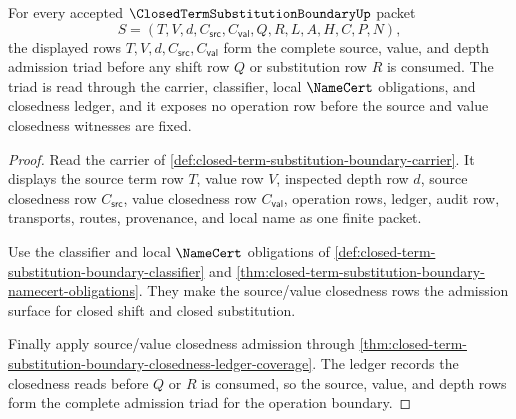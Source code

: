 \begin{theorem}
\label{thm:closed-term-substitution-boundary-source-triad}
For every accepted $\ClosedTermSubstitutionBoundaryUp$ packet
$$
S=(T,V,d,C_{\mathsf{src}},C_{\mathsf{val}},Q,R,L,A,H,C,P,N),
$$
the displayed rows $T,V,d,C_{\mathsf{src}},C_{\mathsf{val}}$ form the complete source, value, and depth admission triad before any shift row $Q$ or substitution row $R$ is consumed. The triad is read through the carrier, classifier, local $\NameCert$ obligations, and closedness ledger, and it exposes no operation row before the source and value closedness witnesses are fixed.
\end{theorem}
\begin{proof}
Read the carrier of \autoref{def:closed-term-substitution-boundary-carrier}. It displays the source term row $T$, value row $V$, inspected depth row $d$, source closedness row $C_{\mathsf{src}}$, value closedness row $C_{\mathsf{val}}$, operation rows, ledger, audit row, transports, routes, provenance, and local name as one finite packet.

Use the classifier and local $\NameCert$ obligations of \autoref{def:closed-term-substitution-boundary-classifier} and \autoref{thm:closed-term-substitution-boundary-namecert-obligations}. They make the source/value closedness rows the admission surface for closed shift and closed substitution.

Finally apply source/value closedness admission through \autoref{thm:closed-term-substitution-boundary-closedness-ledger-coverage}. The ledger records the closedness reads before $Q$ or $R$ is consumed, so the source, value, and depth rows form the complete admission triad for the operation boundary.
\end{proof}

